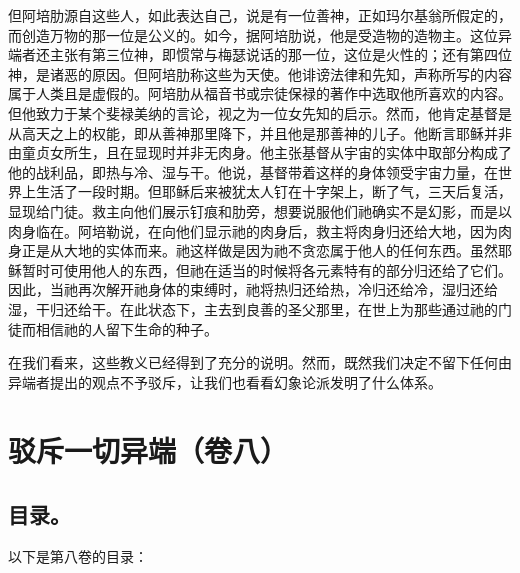 但阿培肋源自这些人，如此表达自己，说是有一位善神，正如玛尔基翁所假定的，而创造万物的那一位是公义的。如今，据阿培肋说，他是受造物的造物主。这位异端者还主张有第三位神，即惯常与梅瑟说话的那一位，这位是火性的；还有第四位神，是诸恶的原因。但阿培肋称这些为天使。他诽谤法律和先知，声称所写的内容属于人类且是虚假的。阿培肋从福音书或宗徒保禄的著作中选取他所喜欢的内容。但他致力于某个斐禄美纳的言论，视之为一位女先知的启示。然而，他肯定基督是从高天之上的权能，即从善神那里降下，并且他是那善神的儿子。他断言耶稣并非由童贞女所生，且在显现时并非无肉身。他主张基督从宇宙的实体中取部分构成了他的战利品，即热与冷、湿与干。他说，基督带着这样的身体领受宇宙力量，在世界上生活了一段时期。但耶稣后来被犹太人钉在十字架上，断了气，三天后复活，显现给门徒。救主向他们展示钉痕和肋旁，想要说服他们祂确实不是幻影，而是以肉身临在。阿培勒说，在向他们显示祂的肉身后，救主将肉身归还给大地，因为肉身正是从大地的实体而来。祂这样做是因为祂不贪恋属于他人的任何东西。虽然耶稣暂时可使用他人的东西，但祂在适当的时候将各元素特有的部分归还给了它们。因此，当祂再次解开祂身体的束缚时，祂将热归还给热，冷归还给冷，湿归还给湿，干归还给干。在此状态下，主去到良善的圣父那里，在世上为那些通过祂的门徒而相信祂的人留下生命的种子。\par

在我们看来，这些教义已经得到了充分的说明。然而，既然我们决定不留下任何由异端者提出的观点不予驳斥，让我们也看看幻象论派发明了什么体系。\par



\section{驳斥一切异端（卷八）}


\subsection{目录。}

以下是第八卷的目录：\newline{}\par

